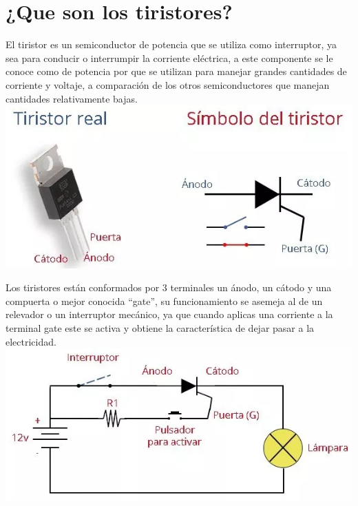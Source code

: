 \documentclass[12pt,a4paper]{article}
\begin{document}
\chapter{¿Que son los tiristores?}
El tiristor es un semiconductor de potencia que se utiliza como interruptor, ya sea para conducir o interrumpir la corriente eléctrica, a este componente se le conoce como de potencia por que se utilizan para manejar grandes cantidades de corriente y voltaje, a comparación de los otros semiconductores que manejan cantidades relativamente bajas.\\
\centering
\includegraphics[scale=.50]{tiristores.png}\\
\raggedright
Los tiristores están conformados por 3 terminales un ánodo, un cátodo y una compuerta o mejor conocida “gate”, su funcionamiento se asemeja al de un relevador o un interruptor mecánico, ya que cuando aplicas una corriente a la terminal gate este se activa y obtiene la característica de dejar pasar a la electricidad.\\
\centering
\includegraphics[scale=.60]{tiristores circuitos.png}\\
\raggedright
\end{document}

